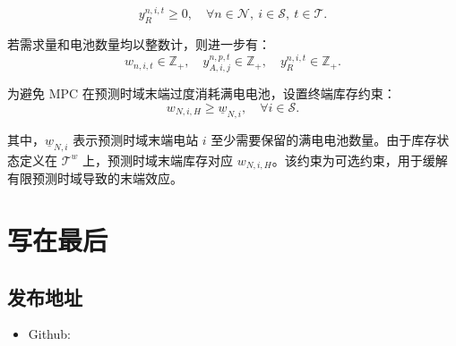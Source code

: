 \documentclass[12pt,hyperref,a4paper,UTF8]{ctexart}
\begin{document}
\begin{equation}
y^{n,i,t}_{R}\ge 0,
\quad \forall n\in \mathcal{N},\ i\in \mathcal{S},\ t\in \mathcal{T}.
\tag{9d}
\end{equation}

若需求量和电池数量均以整数计，则进一步有：
\begin{equation}
w_{n,i,t}\in \mathbb{Z}_{+},\quad
 y^{n,p,t}_{A,i,j}\in \mathbb{Z}_{+},\quad
 y^{n,i,t}_{R}\in \mathbb{Z}_{+}.
\tag{9e}
\end{equation}



为避免 MPC 在预测时域末端过度消耗满电电池，设置终端库存约束：
\begin{equation}
w_{N,i,H}\ge \underline{w}_{N,i},
\quad \forall i\in \mathcal{S}.
\tag{9i}
\end{equation}

其中，$\underline{w}_{N,i}$ 表示预测时域末端电站 $i$ 至少需要保留的满电电池数量。由于库存状态定义在 $\mathcal{T}^{w}$ 上，预测时域末端库存对应 $w_{N,i,H}$。该约束为可选约束，用于缓解有限预测时域导致的末端效应。

\section{写在最后}
\subsection{发布地址}
\begin{itemize}
    \item Github: 
\end{itemize}


\end{document}
